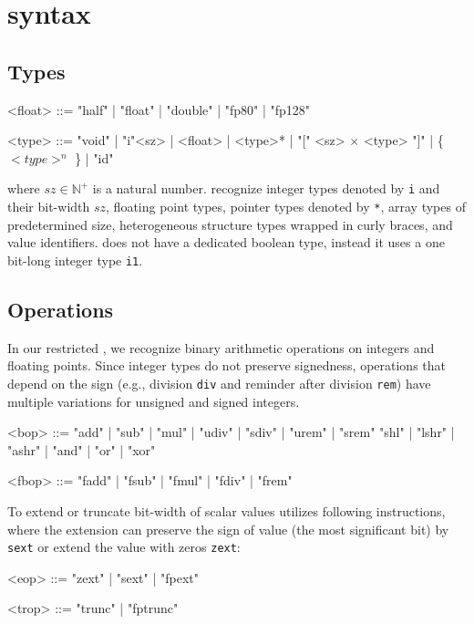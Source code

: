 \chapter{\llvm syntax}
\label{ch:llvm}

\section*{Types}
\begin{grammar}

<float> ::= "half" | "float" | "double" | "fp80" | "fp128"

<type> ::= "void" | "i"<sz> | <float> | <type>* | "[" <sz> $\times$ <type> "]" | \{ $<type>^n$ \} | "id"

\end{grammar}

\noindent
where $sz \in \mathbb{N}^+$ is a natural number. \llvm recognize
integer types denoted by \texttt{i} and their bit-width $sz$, floating point
types, pointer types denoted by \texttt{*}, array types of predetermined size,
heterogeneous structure types wrapped in curly braces, and value identifiers.
\llvm does not have a dedicated boolean type, instead it uses a one bit-long
integer type \texttt{i1}.

\section*{Operations}

In our restricted \llvm, we recognize binary arithmetic operations on integers
and floating points. Since \llvm integer types do not preserve signedness,
operations that depend on the sign (e.g., division \texttt{div} and reminder
after division \texttt{rem}) have multiple variations for unsigned and signed
integers.

\begin{grammar}
<bop> ::= "add" | "sub" | "mul" | "udiv" | "sdiv" | "urem" | "srem" \alt
          "shl" | "lshr" | "ashr" | "and" | "or" | "xor"

<fbop> ::= "fadd" | "fsub" | "fmul" | "fdiv" | "frem"
\end{grammar}

\noindent
To extend or truncate bit-width of scalar values \llvm utilizes following
instructions, where the extension can preserve the sign of value (the most
significant bit) by \texttt{sext} or extend the value with zeros \texttt{zext}:

\begin{grammar}
<eop>  ::= "zext" | "sext" | "fpext"

<trop> ::= "trunc" | "fptrunc"
\end{grammar}

